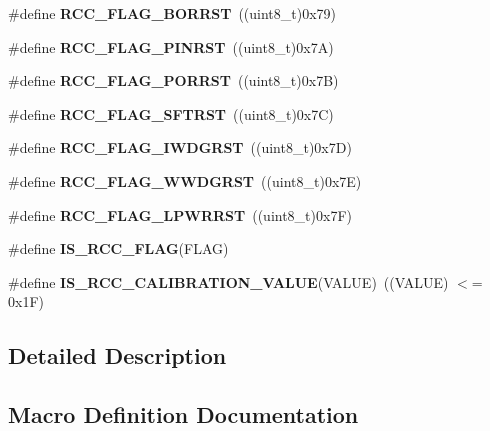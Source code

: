 \begin{DoxyCompactItemize}
\#define {\bfseries R\+C\+C\+\_\+\+F\+L\+A\+G\+\_\+\+B\+O\+R\+R\+ST}~((uint8\+\_\+t)0x79)
\item 
\mbox{\label{group___r_c_c___flag_gabfc3ab5d4a8a94ec1c9f38794ce37ad6}} 
\#define {\bfseries R\+C\+C\+\_\+\+F\+L\+A\+G\+\_\+\+P\+I\+N\+R\+ST}~((uint8\+\_\+t)0x7\+A)
\item 
\mbox{\label{group___r_c_c___flag_ga39ad309070f416720207eece5da7dc2c}} 
\#define {\bfseries R\+C\+C\+\_\+\+F\+L\+A\+G\+\_\+\+P\+O\+R\+R\+ST}~((uint8\+\_\+t)0x7\+B)
\item 
\mbox{\label{group___r_c_c___flag_gaf7852615e9b19f0b2dbc8d08c7594b52}} 
\#define {\bfseries R\+C\+C\+\_\+\+F\+L\+A\+G\+\_\+\+S\+F\+T\+R\+ST}~((uint8\+\_\+t)0x7\+C)
\item 
\mbox{\label{group___r_c_c___flag_gaac46bac8a97cf16635ff7ffc1e6c657f}} 
\#define {\bfseries R\+C\+C\+\_\+\+F\+L\+A\+G\+\_\+\+I\+W\+D\+G\+R\+ST}~((uint8\+\_\+t)0x7\+D)
\item 
\mbox{\label{group___r_c_c___flag_gaa80b60b2d497ccd7b7de1075009999a7}} 
\#define {\bfseries R\+C\+C\+\_\+\+F\+L\+A\+G\+\_\+\+W\+W\+D\+G\+R\+ST}~((uint8\+\_\+t)0x7\+E)
\item 
\mbox{\label{group___r_c_c___flag_ga67049531354aed7546971163d02c9920}} 
\#define {\bfseries R\+C\+C\+\_\+\+F\+L\+A\+G\+\_\+\+L\+P\+W\+R\+R\+ST}~((uint8\+\_\+t)0x7\+F)
\item 
\#define {\bfseries I\+S\+\_\+\+R\+C\+C\+\_\+\+F\+L\+AG}(F\+L\+AG)
\item 
\mbox{\label{group___r_c_c___flag_gafda50a08dc048f7c272bf04ec9c2c2b7}} 
\#define {\bfseries I\+S\+\_\+\+R\+C\+C\+\_\+\+C\+A\+L\+I\+B\+R\+A\+T\+I\+O\+N\+\_\+\+V\+A\+L\+UE}(V\+A\+L\+UE)~((V\+A\+L\+UE) $<$= 0x1\+F)
\end{DoxyCompactItemize}


\subsection{Detailed Description}


\subsection{Macro Definition Documentation}
\mbox{\label{group___r_c_c___flag_gaa27dea5bb62b26d0881e649770252158}} 
